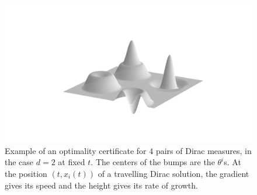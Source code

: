 \begin{figure}%
\centering
 \includegraphics[trim=3cm 3cm 3cm 3cm, width=.7\linewidth]{images/certificate_dec2}%
 \caption{Example of an optimality certificate for $4$ pairs of Dirac measures, in the case $d=2$ at fixed $t$. The centers of the bumps are the $\theta^i$s. At the position $(t,x_i(t))$ of a travelling Dirac solution, the gradient gives its speed and the height gives its rate of growth.} 
 \label{figure certificate}
\end{figure}

